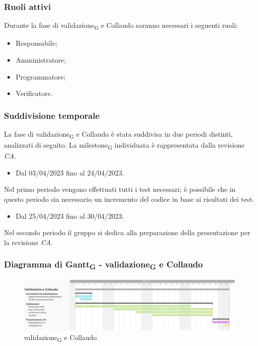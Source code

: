 \subsubsection{Ruoli attivi}
Durante la fase di validazione\textsubscript{G} e Collaudo saranno necessari i seguenti ruoli:
\begin{itemize}
	\item Responsabile;
    \item Amministratore;
    \item Programmatore;
    \item Verificatore.
\end{itemize}

\subsubsection{Suddivisione temporale}
La fase di validazione\textsubscript{G} e Collaudo è stata suddivisa in due periodi distinti, analizzati di seguito. La milestone\textsubscript{G} individuata è rappresentata dalla revisione \textit{CA}.

\:
\begin{itemize}
    \item Dal 03/04/2023 fino al 24/04/2023.
\end{itemize}
Nel primo periodo vengono effettuati tutti i test necessari; è possibile che in questo periodo sia necessario un incremento del codice in base ai risultati dei test.

\:
\begin{itemize}
    \item Dal 25/04/2023 fino al 30/04/2023.
\end{itemize}
Nel secondo periodo il gruppo si dedica alla preparazione della presentazione per la revisione \textit{CA}.

\subsubsection{Diagramma di Gantt\textsubscript{G} - validazione\textsubscript{G} e Collaudo}

\begin{figure}[H]
\centering
\includegraphics[width=\textwidth]{img/4_collaudo.png}
\caption{validazione\textsubscript{G} e Collaudo}
\end{figure}

